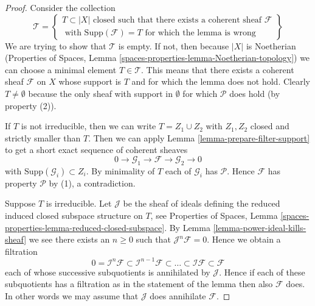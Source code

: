 \begin{proof}
Consider the collection
$$
\mathcal{T} =
\left\{
\begin{matrix}
T \subset |X|
\text{ closed such that there exists a coherent sheaf }
\mathcal{F} \\
\text{ with }
\text{Supp}(\mathcal{F}) = T
\text{ for which the lemma is wrong}
\end{matrix}
\right\}
$$
We are trying to show that $\mathcal{T}$ is empty. If not, then
because $|X|$ is Noetherian (Properties of Spaces, Lemma
\ref{spaces-properties-lemma-Noetherian-topology})
we can choose a minimal element $T \in \mathcal{T}$. This means that
there exists a coherent sheaf $\mathcal{F}$ on $X$ whose support is $T$
and for which the lemma does not hold. Clearly $T \not = \emptyset$
because the only sheaf with support in $\emptyset$ for which $\mathcal{P}$
does hold (by property (2)).

\medskip\noindent
If $T$ is not irreducible, then we can write $T = Z_1 \cup Z_2$
with $Z_1, Z_2$ closed and strictly smaller than $T$.
Then we can apply Lemma \ref{lemma-prepare-filter-support}
to get a short exact sequence of coherent sheaves
$$
0 \to
\mathcal{G}_1 \to
\mathcal{F} \to
\mathcal{G}_2 \to 0
$$
with $\text{Supp}(\mathcal{G}_i) \subset Z_i$. By minimality of
$T$ each of $\mathcal{G}_i$ has $\mathcal{P}$. Hence $\mathcal{F}$
has property $\mathcal{P}$ by (1), a contradiction.

\medskip\noindent
Suppose $T$ is irreducible. Let $\mathcal{J}$ be the sheaf of ideals
defining the reduced induced closed subspace structure on $T$,
see Properties of Spaces, Lemma
\ref{spaces-properties-lemma-reduced-closed-subspace}.
By Lemma \ref{lemma-power-ideal-kills-sheaf} we see there exists
an $n \geq 0$ such that $\mathcal{J}^n\mathcal{F} = 0$. Hence we obtain
a filtration
$$
0 = \mathcal{I}^n\mathcal{F} \subset \mathcal{I}^{n - 1}\mathcal{F}
\subset \ldots \subset \mathcal{I}\mathcal{F} \subset \mathcal{F}
$$
each of whose successive subquotients is annihilated by $\mathcal{J}$.
Hence if each of these subquotients has a filtration as in the statement
of the lemma then also $\mathcal{F}$ does. In other words we may
assume that $\mathcal{J}$ does annihilate $\mathcal{F}$.


\end{proof}

